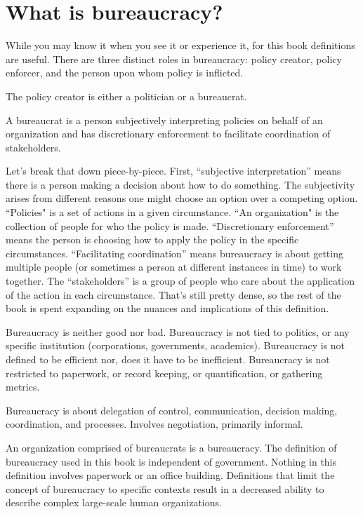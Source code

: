 \section{What is bureaucracy?\label{sec:define_bureaucracy}}

While you may know it when you see it or experience it, for this book definitions are useful. There are three distinct roles in bureaucracy: policy creator, policy enforcer, and the person upon whom policy is inflicted.

The policy creator is either a politician or a bureaucrat. 

A \gls{bureaucrat} is a person subjectively interpreting policies on behalf of an organization and has discretionary enforcement to facilitate coordination of stakeholders. 

Let's break that down piece-by-piece. First, ``subjective interpretation'' means there is a person making a decision about how to do something. The subjectivity arises from different reasons one might choose an option over a competing option.  ``Policies" is a set of actions in a given circumstance. ``An \gls{organization}" is the collection of people for who the policy is made. ``Discretionary enforcement'' means the person is choosing how to apply the policy in the specific circumstances. ``Facilitating coordination'' means bureaucracy is about getting multiple people (or sometimes a person at different instances in time) to work together. The ``stakeholders'' is a group of people who care about the application of the action in each circumstance.  That's still pretty dense, so the rest of the book is spent expanding on the nuances and implications of this definition.

Bureaucracy is neither good nor bad. Bureaucracy is not tied to politics, or any specific institution (corporations, governments, academics). Bureaucracy is not defined to be efficient nor, does it have to be inefficient. Bureaucracy is not restricted to paperwork, or record keeping, or quantification, or gathering metrics. 

Bureaucracy is about delegation of control, communication, decision making, coordination, and processes. Involves negotiation, primarily informal. 

An organization comprised of bureaucrats is a \gls{bureaucracy}. The definition of bureaucracy used in this book is independent of government. Nothing in this definition involves paperwork or an office building. Definitions that limit the concept of bureaucracy to specific contexts result in a decreased ability to describe complex large-scale human organizations. 

